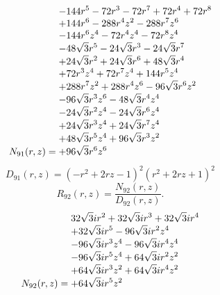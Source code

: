 \documentclass[11pt,a4paper]{article}
\begin{document}
\begin{equation}
N_{91}(r,z)=\shortstack[l]{$\displaystyle  - 144 r^{5} - 72 r^{3} - 72 r^{7} + 72 r^{4} + 72 r^{8}$\\
$\displaystyle  + 144 r^{6} - 288 r^{4} z^{2} - 288 r^{7} z^{6}$\\
$\displaystyle  - 144 r^{6} z^{4} - 72 r^{4} z^{4} - 72 r^{8} z^{4}$\\
$\displaystyle  - 48 \sqrt{3} r^{5} - 24 \sqrt{3} r^{3} - 24 \sqrt{3} r^{7}$\\
$\displaystyle  + 24 \sqrt{3} r^{2} + 24 \sqrt{3} r^{6} + 48 \sqrt{3} r^{4}$\\
$\displaystyle  + 72 r^{3} z^{4} + 72 r^{7} z^{4} + 144 r^{5} z^{4}$\\
$\displaystyle  + 288 r^{7} z^{2} + 288 r^{4} z^{6} - 96 \sqrt{3} r^{6} z^{2}$\\
$\displaystyle  - 96 \sqrt{3} r^{3} z^{6} - 48 \sqrt{3} r^{4} z^{4}$\\
$\displaystyle  - 24 \sqrt{3} r^{2} z^{4} - 24 \sqrt{3} r^{6} z^{4}$\\
$\displaystyle  + 24 \sqrt{3} r^{3} z^{4} + 24 \sqrt{3} r^{7} z^{4}$\\
$\displaystyle  + 48 \sqrt{3} r^{5} z^{4} + 96 \sqrt{3} r^{3} z^{2}$\\
$\displaystyle  + 96 \sqrt{3} r^{6} z^{6}$}
\label{eq:cat-numerator-91}
\end{equation}
\begin{equation}
D_{91}(r,z)=\left(- r^{2} + 2 r z - 1\right)^{2} \left(r^{2} + 2 r z + 1\right)^{2}
\label{eq:cat-denominator-91}
\end{equation}
\begin{equation}
R_{92}(r,z)=\frac{N_{92}(r,z)}{D_{92}(r,z)}.
\label{eq:cat-rational-92}
\end{equation}
\begin{equation}
N_{92}(r,z)=\shortstack[l]{$\displaystyle 32 \sqrt{3} i r^{2} + 32 \sqrt{3} i r^{3} + 32 \sqrt{3} i r^{4}$\\
$\displaystyle  + 32 \sqrt{3} i r^{5} - 96 \sqrt{3} i r^{2} z^{4}$\\
$\displaystyle  - 96 \sqrt{3} i r^{3} z^{4} - 96 \sqrt{3} i r^{4} z^{4}$\\
$\displaystyle  - 96 \sqrt{3} i r^{5} z^{4} + 64 \sqrt{3} i r^{2} z^{2}$\\
$\displaystyle  + 64 \sqrt{3} i r^{3} z^{2} + 64 \sqrt{3} i r^{4} z^{2}$\\
$\displaystyle  + 64 \sqrt{3} i r^{5} z^{2}$}
\label{eq:cat-numerator-92}
\end{equation}
\end{document}
